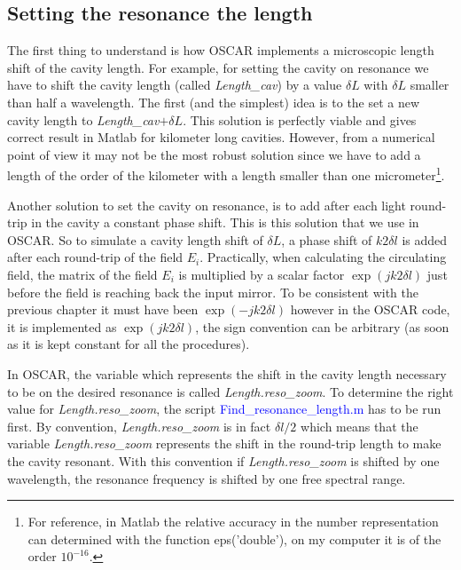 \subsection{Setting the resonance the length}

The first thing to understand is how OSCAR implements a microscopic length shift of the cavity length. For example, for setting the cavity on resonance we have to shift the cavity length (called \textsl{Length\_cav}) by a value $\delta L$ with $\delta L$ smaller than half a wavelength. The first (and the simplest) idea is to the set a new cavity length to \textsl{Length\_cav}$ + \delta L$. This solution is perfectly viable and gives correct result in Matlab for kilometer long cavities. However, from a numerical point of view it may not be the most robust solution since we have to add a length of the order of the kilometer with a length smaller than one micrometer\footnote{For reference, in Matlab the relative accuracy in the number representation can determined with the function eps('double'), on my computer it is of the order $10^{-16}$.}.

Another solution to set the cavity on resonance, is to add after each light round-trip in the cavity a constant phase shift. This is this solution that we use in OSCAR. So to simulate a cavity length shift of $\delta L$, a phase shift of $ k 2 \delta l$ is added after each round-trip of the field $E_i$. Practically, when calculating the circulating field, the matrix of the field $E_i$ is multiplied by a scalar factor $\exp{(j k 2 \delta l)}$ just before the field is reaching back the input mirror. To be consistent with the previous chapter it must have been $\exp{(-j k 2 \delta l)}$ however in the OSCAR code, it is implemented as $\exp{(j k 2 \delta l)}$, the sign convention can be arbitrary (as soon as it is kept constant for all the procedures).

In OSCAR, the variable which represents the shift in the cavity length necessary to be on the desired resonance is called \textsl{Length.reso\_zoom}. To determine the right value for \textsl{Length.reso\_zoom}, the script \textcolor{blue}{Find\_resonance\_length.m} has to be run first. By convention, \textsl{Length.reso\_zoom} is in fact $\delta l/2$ which means that the variable \textsl{Length.reso\_zoom} represents the shift in the round-trip length to make the cavity resonant. With this convention if \textsl{Length.reso\_zoom} is shifted by one wavelength, the resonance frequency is shifted by one free spectral range.\\


